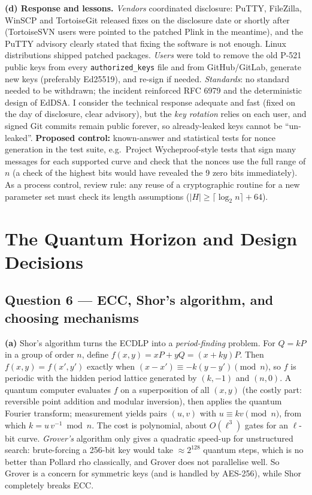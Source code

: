 \documentclass[11pt,a4paper]{article}
\begin{document}
\textbf{(d) Response and lessons.} \emph{Vendors} coordinated disclosure: PuTTY, FileZilla, WinSCP and
TortoiseGit released fixes on the disclosure date or shortly after (TortoiseSVN users were pointed to the patched
Plink in the meantime), and the PuTTY advisory clearly stated that
fixing the software is not enough. Linux distributions shipped patched packages. \emph{Users} were told to
remove the old P-521 public keys from every \texttt{authorized\_keys} file and from GitHub/GitLab, generate new keys
(preferably Ed25519), and re-sign if needed. \emph{Standards}: no standard needed to be withdrawn; the incident
reinforced RFC 6979 and the deterministic design of EdDSA. I consider the technical response adequate and
fast (fixed on the day of disclosure, clear advisory), but the \emph{key rotation} relies on each user, and
signed Git commits remain public forever, so already-leaked keys cannot be ``un-leaked''. \textbf{Proposed control:}
known-answer and statistical tests for nonce generation in the test suite, e.g.\ Project Wycheproof-style tests
that sign many messages for each supported curve and check that the nonces use the full range of $n$ (a
check of the highest bits would have revealed the 9 zero bits immediately). As a process control,
review rule: any reuse of a cryptographic routine for a new parameter set must check its length
assumptions ($|H| \ge \lceil \log_2 n \rceil + 64$).

\section*{The Quantum Horizon and Design Decisions}

\subsection*{Question 6 --- ECC, Shor's algorithm, and choosing mechanisms}
\textbf{(a)} Shor's algorithm turns the ECDLP into a \emph{period-finding} problem. For $Q=kP$ in a group of
order $n$, define $f(x,y) = xP + yQ = (x+ky)P$. Then $f(x,y) = f(x',y')$ exactly when
$(x-x') \equiv -k(y-y') \pmod n$, so $f$ is periodic with the hidden period lattice generated by $(k,-1)$ and $(n,0)$.
A quantum computer evaluates $f$ on a superposition of all $(x,y)$ (the costly part: reversible point addition and
modular inversion), then applies the quantum Fourier transform; measurement yields pairs $(u,v)$ with
$u \equiv kv \pmod n$, from which $k = u\,v^{-1} \bmod n$. The cost is polynomial, about $O(\ell^3)$ gates for an $\ell$-bit curve.
\emph{Grover's} algorithm only gives a quadratic speed-up for unstructured search: brute-forcing a 256-bit
key would take $\approx 2^{128}$ quantum steps, which is no better than Pollard rho classically, and Grover
does not parallelise well. So Grover is a concern for symmetric keys (and is handled by AES-256), while
Shor completely breaks ECC.
\end{document}
